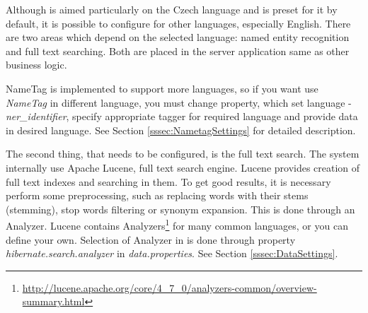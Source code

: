 
Although \textan{} is aimed particularly on the Czech language and is preset for
it by default, it is possible to configure \textan{} for other languages, especially
English.  There are two areas which depend on the selected language: named entity
recognition and full text searching. Both are placed in the server application
same as other business logic.

NameTag is implemented to support more languages, so if you want use {\it NameTag} in different language, you must change property, which set language  - {\it ner\_identifier},
specify appropriate tagger for required language and provide data in desired language.
See Section \ref{sssec:NametagSettings} for detailed description.

The second thing, that needs to be configured, is the full text search. The system
internally use Apache Lucene, full text search engine. Lucene provides creation
of full text indexes and searching in them. To get good results, it is necessary
perform some preprocessing, such as replacing words with their stems (stemming),
stop words filtering or synonym expansion. This is done through an Analyzer. Lucene
contains Analyzers\footnote{\url{http://lucene.apache.org/core/4_7_0/analyzers-common/overview-summary.html}}
for many common languages, or you can define your own. Selection of Analyzer in 
\textan{} is done through property \emph{hibernate.search.analyzer} in \emph{data.properties}.
See Section \ref{sssec:DataSettings}.

